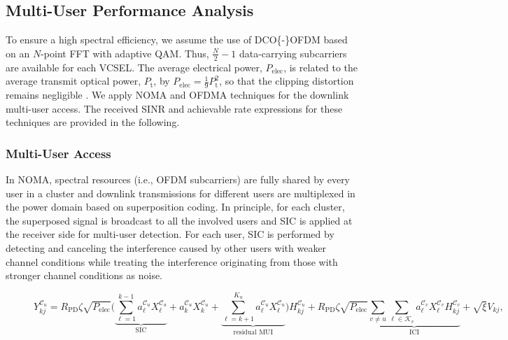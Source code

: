 \documentclass[lettersize,journal]{IEEEtran}
\begin{document}
\vspace{-10pt}

\subsection{Multi-User Performance Analysis}
To ensure a high spectral efficiency, we assume the use of \ac{DCO{-}OFDM} based on an $N$-point \ac{FFT} with adaptive \ac{QAM}. Thus, $\frac{N}{2}-1$ data-carrying subcarriers are available for each \ac{VCSEL}. The average electrical power, $P_\mathrm{elec}$, is related to the average transmit optical power, $P_\mathrm{t}$, by $P_\mathrm{elec}=\frac{1}{9}P_\mathrm{t}^2$, so that the clipping distortion remains negligible \cite{Dimitrov20122}. We apply \ac{NOMA} and \ac{OFDMA} techniques for the downlink multi-user access. The received \ac{SINR} and achievable rate expressions for these techniques are provided in the following.

\subsubsection{Multi-User Access}
In \ac{NOMA}, spectral resources (i.e., \acs{OFDM} subcarriers) are fully shared by every user in a cluster and downlink transmissions for different users are multiplexed in the power domain based on superposition coding. In principle, for each cluster, the superposed signal is broadcast to all the involved users and \ac{SIC} is applied at the receiver side for multi-user detection. For each user, \ac{SIC} is performed by detecting and canceling the interference caused by other users with weaker channel conditions while treating the interference originating from those with stronger channel conditions as noise.
\setcounter{mytempeqncnt1}{\value{equation}}
\setcounter{equation}{46}
\begin{figure}[t!]
\normalsize
\begin{equation}\label{NOMA:eq2}
    Y_{kj}^{\mathcal{C}_u} = R_\mathrm{PD}\zeta\sqrt{P_\mathrm{elec}}\Bigg(\underbrace{\sum_{\ell=1}^{k-1}a_\ell^{\mathcal{C}_u} X_\ell^{\mathcal{C}_u}}_{\text{SIC}}+a_k^{\mathcal{C}_u} X_k^{\mathcal{C}_u}+\underbrace{\sum_{\ell=k+1}^{K_u}a_\ell^{\mathcal{C}_u} X_\ell^{\mathcal{C}_u}}_{\text{residual MUI}}\Bigg)H^{\mathcal{C}_u}_{kj}
    +R_\mathrm{PD}\zeta\sqrt{P_\mathrm{elec}}\underbrace{\sum_{v\neq u}\sum_{\ell\in\mathcal{K}_v} a_\ell^{\mathcal{C}_v} X_\ell^{\mathcal{C}_v} H^{\mathcal{C}_v}_{kj}}_{\text{ICI}}+\sqrt{\xi}V_{kj},
\end{equation}
\hrulefill
\vspace{-10pt}
\end{figure}
\setcounter{equation}{\value{mytempeqncnt1}}
\end{document}
